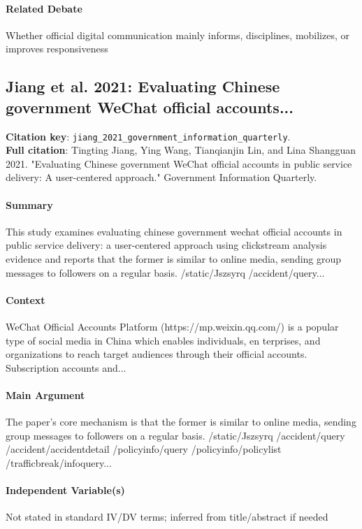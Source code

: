 \documentclass[12pt]{article}
\begin{document}
\paragraph{Related Debate} Whether official digital communication mainly informs, disciplines, mobilizes, or improves responsiveness


\subsection{Jiang et al. 2021: Evaluating Chinese government WeChat official accounts...}
\textbf{Citation key}: \texttt{jiang\_2021\_government\_information\_quarterly}.\\
\textbf{Full citation}: Tingting Jiang, Ying Wang, Tianqianjin Lin, and Lina Shangguan 2021. "Evaluating Chinese government WeChat official accounts in public service delivery: A user-centered approach." Government Information Quarterly.

\paragraph{Summary} This study examines evaluating chinese government wechat official accounts in public service delivery: a user-centered approach using clickstream analysis evidence and reports that the former is similar to online media, sending group messages to followers on a regular basis. /static/Jszsyrq /accident/query...

\paragraph{Context} WeChat Official Accounts Platform (https://mp.weixin.qq.com/) is a popular type of social media in China which enables individuals, en terprises, and organizations to reach target audiences through their official accounts. Subscription accounts and...

\paragraph{Main Argument} The paper's core mechanism is that the former is similar to online media, sending group messages to followers on a regular basis. /static/Jszsyrq /accident/query /accident/accidentdetail /policyinfo/query /policyinfo/policylist /trafficbreak/infoquery...

\paragraph{Independent Variable(s)} Not stated in standard IV/DV terms; inferred from title/abstract if needed
\end{document}
